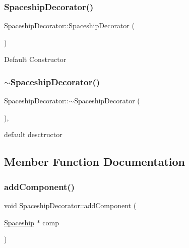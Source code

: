 \subsubsection{\texorpdfstring{Spaceship\+Decorator()}{SpaceshipDecorator()}}
{\footnotesize\ttfamily Spaceship\+Decorator\+::\+Spaceship\+Decorator (\begin{DoxyParamCaption}{ }\end{DoxyParamCaption})}

Default Constructor \mbox{\label{classSpaceshipDecorator_ad29c1235cbfe963e073fd63ea607bf35}} 
\subsubsection{\texorpdfstring{$\sim$\+Spaceship\+Decorator()}{~SpaceshipDecorator()}}
{\footnotesize\ttfamily Spaceship\+Decorator\+::$\sim$\+Spaceship\+Decorator (\begin{DoxyParamCaption}{ }\end{DoxyParamCaption})\hspace{0.3cm}{\ttfamily [inline]}, {\ttfamily [protected]}}

default desctructor 

\subsection{Member Function Documentation}
\mbox{\label{classSpaceshipDecorator_a08442441af1fa8979f1e411a5e7b511c}} 
\subsubsection{\texorpdfstring{add\+Component()}{addComponent()}}
{\footnotesize\ttfamily void Spaceship\+Decorator\+::add\+Component (\begin{DoxyParamCaption}\item[{\hyperlink{classSpaceship}{Spaceship} $\ast$}]{comp }\end{DoxyParamCaption})\hspace{0.3cm}{\ttfamily [virtual]}}

